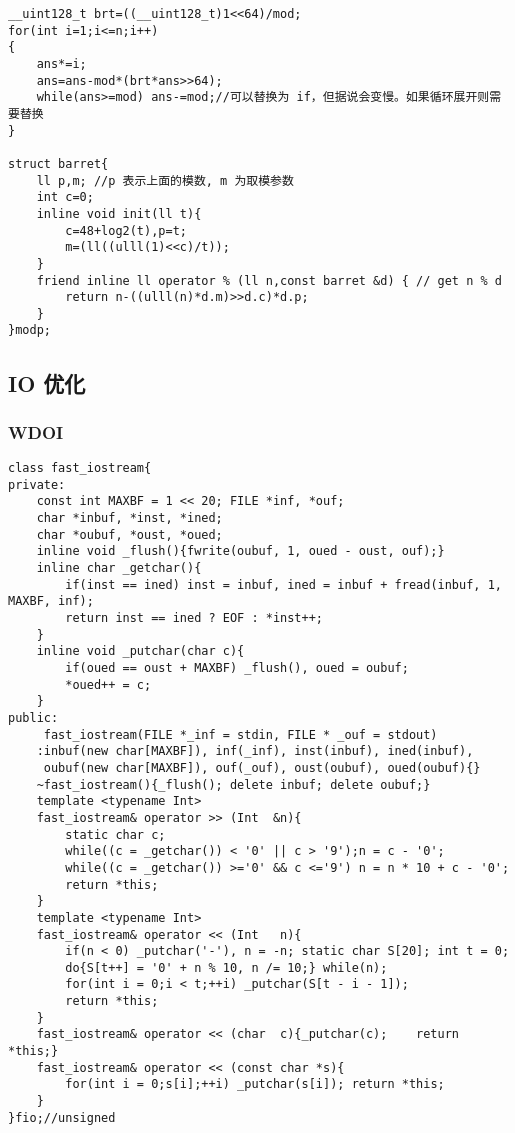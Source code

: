 \documentclass[12pt]{ctexart}
\begin{document}
\begin{lstlisting}
__uint128_t brt=((__uint128_t)1<<64)/mod;
for(int i=1;i<=n;i++)
{
	ans*=i;
	ans=ans-mod*(brt*ans>>64);
	while(ans>=mod) ans-=mod;//可以替换为 if，但据说会变慢。如果循环展开则需要替换
}

struct barret{
    ll p,m; //p 表示上面的模数, m 为取模参数
    int c=0;
    inline void init(ll t){
    	c=48+log2(t),p=t;
		m=(ll((ulll(1)<<c)/t));
	}
    friend inline ll operator % (ll n,const barret &d) { // get n % d
        return n-((ulll(n)*d.m)>>d.c)*d.p;
    }
}modp;
\end{lstlisting}

\subsection{IO 优化}

\subsubsection{WDOI}

\begin{lstlisting}
class fast_iostream{
private:
	const int MAXBF = 1 << 20; FILE *inf, *ouf;
	char *inbuf, *inst, *ined;
	char *oubuf, *oust, *oued;
	inline void _flush(){fwrite(oubuf, 1, oued - oust, ouf);}
	inline char _getchar(){
		if(inst == ined) inst = inbuf, ined = inbuf + fread(inbuf, 1, MAXBF, inf);
		return inst == ined ? EOF : *inst++;
	}
	inline void _putchar(char c){
		if(oued == oust + MAXBF) _flush(), oued = oubuf;
		*oued++ = c;
	}
public:
	 fast_iostream(FILE *_inf = stdin, FILE * _ouf = stdout)
	:inbuf(new char[MAXBF]), inf(_inf), inst(inbuf), ined(inbuf),
	 oubuf(new char[MAXBF]), ouf(_ouf), oust(oubuf), oued(oubuf){}
	~fast_iostream(){_flush(); delete inbuf; delete oubuf;}
	template <typename Int>
	fast_iostream& operator >> (Int  &n){
		static char c;
		while((c = _getchar()) < '0' || c > '9');n = c - '0';
		while((c = _getchar()) >='0' && c <='9') n = n * 10 + c - '0';
		return *this;
	}
	template <typename Int>
	fast_iostream& operator << (Int   n){
		if(n < 0) _putchar('-'), n = -n; static char S[20]; int t = 0;
		do{S[t++] = '0' + n % 10, n /= 10;} while(n);
		for(int i = 0;i < t;++i) _putchar(S[t - i - 1]);
		return *this;
	}
	fast_iostream& operator << (char  c){_putchar(c);    return *this;}
	fast_iostream& operator << (const char *s){
		for(int i = 0;s[i];++i) _putchar(s[i]); return *this;
	}
}fio;//unsigned
\end{lstlisting}
\end{document}
